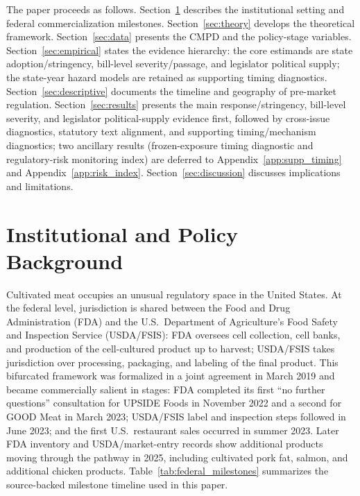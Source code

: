 \documentclass[12pt]{article}
\begin{document}
The paper proceeds as follows.  Section~\ref{sec:background} describes the institutional setting and federal commercialization milestones.  Section~\ref{sec:theory} develops the theoretical framework.  Section~\ref{sec:data} presents the CMPD and the policy-stage variables.  Section~\ref{sec:empirical} states the evidence hierarchy: the core estimands are state adoption/stringency, bill-level severity/passage, and legislator political supply; the state-year hazard models are retained as supporting timing diagnostics.  Section~\ref{sec:descriptive} documents the timeline and geography of pre-market regulation.  Section~\ref{sec:results} presents the main response/stringency, bill-level severity, and legislator political-supply evidence first, followed by cross-issue diagnostics, statutory text alignment, and supporting timing/mechanism diagnostics; two ancillary results (frozen-exposure timing diagnostic and regulatory-risk monitoring index) are deferred to Appendix~\ref{app:supp_timing} and Appendix~\ref{app:risk_index}.  Section~\ref{sec:discussion} discusses implications and limitations.

\section{Institutional and Policy Background}
\label{sec:background}

Cultivated meat occupies an unusual regulatory space in the United States.  At the federal level, jurisdiction is shared between the Food and Drug Administration (FDA) and the U.S.\ Department of Agriculture's Food Safety and Inspection Service (USDA/FSIS): FDA oversees cell collection, cell banks, and production of the cell-cultured product up to harvest; USDA/FSIS takes jurisdiction over processing, packaging, and labeling of the final product.  This bifurcated framework was formalized in a joint agreement in March 2019 and became commercially salient in stages: FDA completed its first ``no further questions'' consultation for UPSIDE Foods in November 2022 and a second for GOOD Meat in March 2023; USDA/FSIS label and inspection steps followed in June 2023; and the first U.S.\ restaurant sales occurred in summer 2023.  Later FDA inventory and USDA/market-entry records show additional products moving through the pathway in 2025, including cultivated pork fat, salmon, and additional chicken products.  Table~\ref{tab:federal_milestones} summarizes the source-backed milestone timeline used in this paper.
\end{document}
